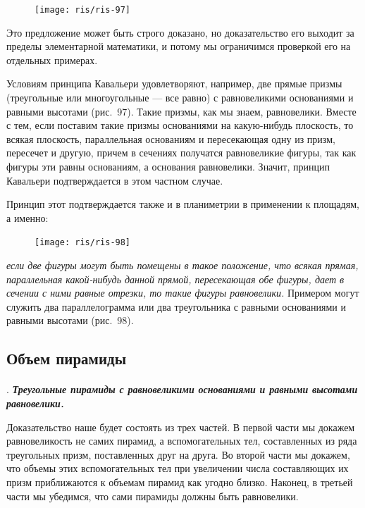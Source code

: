 \documentclass[twoside]{book}
\begin{document}
\begin{figure}[h!]
\centering
\texttt{[image: ris/ris-97]}
\caption{}
\end{figure}

Это предложение может быть строго доказано, но доказательство его выходит за пределы элементарной математики, и потому мы ограничимся проверкой его на отдельных примерах.

Условиям принципа Кавальери удовлетворяют, например, две прямые призмы (треугольные или многоугольные --- все равно) с равновеликими основаниями и равными высотами (рис.~97).
Такие призмы, как мы знаем, равновелики.
Вместе с тем, если поставим такие призмы основаниями на какую-нибудь плоскость, то всякая плоскость, параллельная основаниям и пересекающая одну из призм, пересечет и другую, причем в сечениях получатся равновеликие фигуры, так как фигуры эти равны основаниям, а основания равновелики.
Значит, принцип Кавальери подтверждается в этом частном случае.

Принцип этот подтверждается также и в планиметрии в применении к площадям, а именно: 
\begin{figure}[h!]
\centering
\texttt{[image: ris/ris-98]}
\caption{}
\end{figure}
\emph{если две фигуры могут быть помещены в такое положение, что всякая прямая, параллельная какой-нибудь данной прямой, пересекающая обе фигуры, дает в сечении с ними равные отрезки, то такие фигуры равновелики.}
Примером могут служить два параллелограмма или два треугольника с равными основаниями и равными высотами (рис.~98).

\subsection*{Объем пирамиды}

\paragraph{}\label{1938/s90}
.
\textbf{\emph{Треугольные пирамиды с равновеликими основаниями и равными высотами равновелики.}}

Доказательство наше будет состоять из трех частей.
В первой части мы докажем равновеликость не самих пирамид, а вспомогательных тел, составленных из ряда треугольных призм, поставленных друг на друга.
Во второй части мы докажем, что объемы этих вспомогательных тел при увеличении числа составляющих их призм приближаются к объемам пирамид как угодно близко.
Наконец, в третьей части мы убедимся, что сами пирамиды должны быть равновелики.
\end{document}
